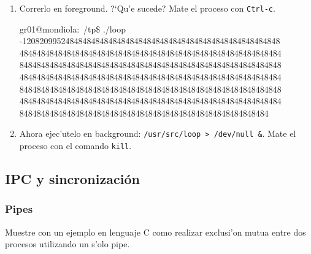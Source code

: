\begin{enumerate}
\item Correrlo en foreground. ?`Qu'e sucede? Mate el proceso con \texttt{Ctrl-c}.

\begin{envRespuesta}
gr01@mondiola:~/tp\$ ./loop\\
-120820995248484848484848484848484848484848484848484848484848\\
4848484848484848484848484848484848484848484848484848484848484\\
8484848484848484848484848484848484848484848484848484848484848\\
4848484848484848484848484848484848484848484848484848484848484\\
8484848484848484848484848484848484848484848484848484848484848\\
4848484848484848484848484848484848484848484848484848484848484\\
8484848484848484848484848484848484848484848484848484848484
\end{envRespuesta}

\item Ahora ejec'utelo en background: \texttt{/usr/src/loop > /dev/null \&}. Mate el proceso con el comando \texttt{kill}.


\end{enumerate}

\subsection{IPC y sincronizaci\'on}

\subsubsection{Pipes}

Muestre con un ejemplo en lenguaje C como realizar exclusi'on mutua entre dos procesos utilizando un s'olo pipe.

